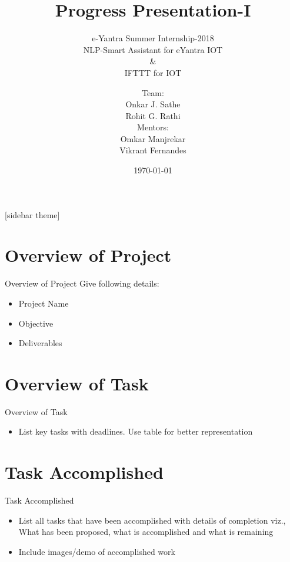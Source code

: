 \documentclass[10pt, a4paper]{beamer}
\begin{document}
	\title{Progress Presentation-I}
	\subtitle{e-Yantra Summer Internship-2018
	\newline
	\\ NLP-Smart Assistant for eYantra IOT
	\\\&
	\\IFTTT for IOT}
	\author{
	Team:
	\\Onkar J. Sathe
	\\Rohit G. Rathi
	\\Mentors:
	\\Omkar Manjrekar
	\\Vikrant Fernandes}
	\date{\today}
	\frame{\titlepage}

[sidebar theme]
\section{Overview of Project}
\begin{frame}{Overview of Project}
	Give following details: \\
	\begin{itemize}
		\item Project Name
		\item Objective
		\item Deliverables
	\end{itemize}
\end{frame}

\section{Overview of Task}
\begin{frame}{Overview of Task}
	\begin{itemize}
		\item List key tasks with deadlines. Use table for better representation
	\end{itemize}
\end{frame}

\section{Task Accomplished}
\begin{frame}{Task Accomplished}
	\begin{itemize}
		\item List all tasks that have been accomplished with details of completion viz., What has been proposed, what is accomplished and what is remaining  
		\item Include images/demo of accomplished work
	\end{itemize}
\end{frame}
\end{document}
